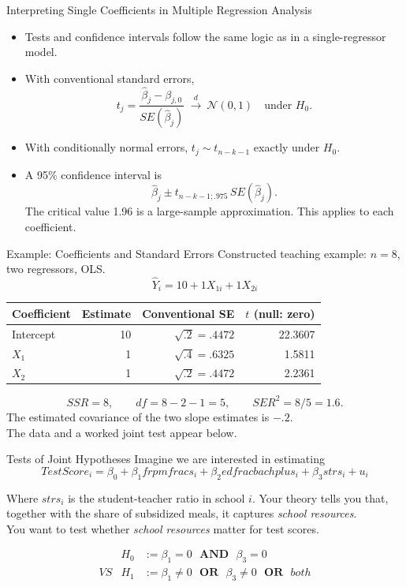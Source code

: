\documentclass[notes,10pt, aspectratio=169]{beamer}
\begin{document}
\begin{frame}{Interpreting Single Coefficients in Multiple Regression Analysis}
\begin{itemize}
\item Tests and confidence intervals follow the same logic as in a single-regressor model.\\[1em]
\item With conventional standard errors,
\[t_j=\frac{\hat\beta_j-\beta_{j,0}}{SE(\hat\beta_j)}\ \xrightarrow{d}\ \mathcal N(0,1)\quad\text{under }H_0.\]
\item With conditionally normal errors, $t_j\sim t_{n-k-1}$ exactly under $H_0$.\\[1em]
\item A 95\% confidence interval is
\[\hat\beta_j\pm t_{n-k-1;.975}\,SE(\hat\beta_j).\]
The critical value 1.96 is a large-sample approximation. This applies to each coefficient.
\end{itemize}
\end{frame}


\begin{frame}{Example: Coefficients and Standard Errors}
Constructed teaching example: $n=8$, two regressors, OLS.
\[\widehat Y_i=10+1X_{1i}+1X_{2i}\]
\begin{center}
\begin{tabular}{lrrr}
\toprule
Coefficient & Estimate & Conventional SE & $t$ (null: zero)\\
\midrule
Intercept & 10 & $\sqrt{.2}=.4472$ & 22.3607\\
$X_1$ & 1 & $\sqrt{.4}=.6325$ & 1.5811\\
$X_2$ & 1 & $\sqrt{.2}=.4472$ & 2.2361\\
\bottomrule
\end{tabular}
\end{center}
\[SSR=8,\qquad df=8-2-1=5,\qquad SER^2=8/5=1.6.\]
The estimated covariance of the two slope estimates is $-.2$.\\[.5em]
The data and a worked joint test appear below.
\end{frame}

\begin{frame}{Tests of Joint Hypotheses }
Imagine we are interested in estimating
\begin{equation*}
    TestScore_i = \beta_0 + \beta_1 frpmfracs_i + \beta_2 edfracbachplus_i + \beta_3 strs_i + u_i
\end{equation*}

Where $strs_i$ is the student-teacher ratio in school $i$. Your theory tells you that, together with the share of subsidized meals, it captures \textit{school resources}.\\[1em]

You want to test whether \textit{school resources} matter for test scores.

\begin{eqnarray*}
    & H_0 &:= \beta_1=0 \textbf{~~AND~~} \beta_3=0\\
    VS & H_1 &:= \beta_1\neq0 \textbf{~~OR~~} \beta_3\neq0 \textbf{~~OR~~} both \\
\end{eqnarray*}


\end{frame}
\end{document}
